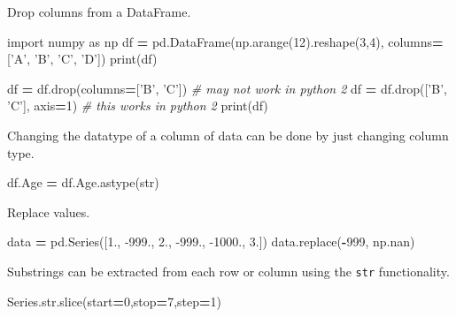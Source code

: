 \documentclass[]{book}
\newenvironment{Shaded}{\begin{snugshade}}{\end{snugshade}}
\newcommand{\BuiltInTok}[1]{#1}
\newcommand{\CommentTok}[1]{\textcolor[rgb]{0.56,0.35,0.01}{\textit{#1}}}
\newcommand{\DecValTok}[1]{\textcolor[rgb]{0.00,0.00,0.81}{#1}}
\newcommand{\FloatTok}[1]{\textcolor[rgb]{0.00,0.00,0.81}{#1}}
\newcommand{\ImportTok}[1]{#1}
\newcommand{\NormalTok}[1]{#1}
\newcommand{\OperatorTok}[1]{\textcolor[rgb]{0.81,0.36,0.00}{\textbf{#1}}}
\newcommand{\StringTok}[1]{\textcolor[rgb]{0.31,0.60,0.02}{#1}}
\begin{document}
Drop columns from a DataFrame.

\begin{Shaded}
\begin{Highlighting}[]
\ImportTok{import}\NormalTok{ numpy }\ImportTok{as}\NormalTok{ np}
\NormalTok{df }\OperatorTok{=}\NormalTok{ pd.DataFrame(np.arange(}\DecValTok{12}\NormalTok{).reshape(}\DecValTok{3}\NormalTok{,}\DecValTok{4}\NormalTok{),}
\NormalTok{                    columns}\OperatorTok{=}\NormalTok{[}\StringTok{'A'}\NormalTok{, }\StringTok{'B'}\NormalTok{, }\StringTok{'C'}\NormalTok{, }\StringTok{'D'}\NormalTok{])}
\BuiltInTok{print}\NormalTok{(df)}

\NormalTok{df }\OperatorTok{=}\NormalTok{ df.drop(columns}\OperatorTok{=}\NormalTok{[}\StringTok{'B'}\NormalTok{, }\StringTok{'C'}\NormalTok{]) }\CommentTok{# may not work in python 2}
\NormalTok{df }\OperatorTok{=}\NormalTok{ df.drop([}\StringTok{'B'}\NormalTok{, }\StringTok{'C'}\NormalTok{], axis}\OperatorTok{=}\DecValTok{1}\NormalTok{) }\CommentTok{# this works in python 2}
\BuiltInTok{print}\NormalTok{(df)}
\end{Highlighting}
\end{Shaded}

Changing the datatype of a column of data can be done by just changing column type.

\begin{Shaded}
\begin{Highlighting}[]
\NormalTok{df.Age }\OperatorTok{=}\NormalTok{ df.Age.astype(}\BuiltInTok{str}\NormalTok{)}
\end{Highlighting}
\end{Shaded}

Replace values.

\begin{Shaded}
\begin{Highlighting}[]
\NormalTok{data }\OperatorTok{=}\NormalTok{ pd.Series([}\FloatTok{1.}\NormalTok{, }\FloatTok{-999.}\NormalTok{, }\FloatTok{2.}\NormalTok{, }\FloatTok{-999.}\NormalTok{, }\FloatTok{-1000.}\NormalTok{, }\FloatTok{3.}\NormalTok{])}
\NormalTok{data.replace(}\OperatorTok{-}\DecValTok{999}\NormalTok{, np.nan)}
\end{Highlighting}
\end{Shaded}

Substrings can be extracted from each row or column using the \texttt{str} functionality.

\begin{Shaded}
\begin{Highlighting}[]
\NormalTok{Series.}\BuiltInTok{str}\NormalTok{.}\BuiltInTok{slice}\NormalTok{(start}\OperatorTok{=}\DecValTok{0}\NormalTok{,stop}\OperatorTok{=}\DecValTok{7}\NormalTok{,step}\OperatorTok{=}\DecValTok{1}\NormalTok{)}
\end{Highlighting}
\end{Shaded}
\end{document}
